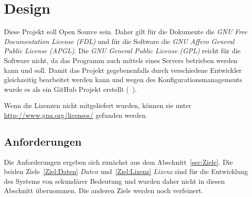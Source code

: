 \documentclass[english,ngerman,parskip=half,headsepline,footsepline]{scrreprt}
\begin{document}

	\chapter{Design} %
	
	\thispagestyle{scrheadings}

	Diese Projekt soll Open Source sein. Daher gilt für die Dokumente die \emph{GNU Free Documentation License (FDL)} und für die Software die \emph{GNU Affero General Public License (APGL)}. Die \emph{GNU General Public License (GPL)} reicht für die Software nicht, da das Programm auch mittels eines Servers betrieben werden kann und soll. Damit das Projekt gegebenenfalls durch verschiedene Entwickler gleichzeitig bearbeitet werden kann und wegen des Konfigurationsmanagements wurde es als ein GitHub Projekt erstellt (\seename~\cite{bib:ASBA}).

	Wenn die Lizenzen nicht mitgeliefert wurden, können sie unter \url{http://www.gnu.org/licenses/} gefunden werden.

	\section{Anforderungen}
	\label{Anforderungen}

	Die Anforderungen ergeben sich zunächst aus dem Abschnitt~\vref{sec:Ziele}. Die beiden Ziele~\ref{Ziel:Daten} \emph{Daten} und~\ref{Ziel:Lizenz} \emph{Lizenz} sind für die Entwicklung des Systems von sekundärer Bedeutung und wurden daher nicht in diesen Abschnitt übernommen. Die anderen Ziele werden noch verfeinert.
\end{document}
